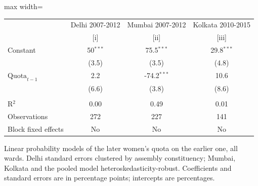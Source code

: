 
\begingroup
\centering
\scriptsize
\begin{adjustbox}{max width=\linewidth}
   \begin{threeparttable}[b]
      \begin{tabular}{lccc}
         \toprule
                               & Delhi 2007-2012 & Mumbai 2007-2012 & Kolkata 2010-2015 \\
                               & [i]             & [ii]             & [iii]\\
         \midrule
         Constant              & 50$^{***}$      & 75.5$^{***}$     & 29.8$^{***}$\\
                               & (3.5)           & (3.5)            & (4.8)\\
         $\text{Quota}_{t-1}$  & 2.2             & -74.2$^{***}$    & 10.6\\
                               & (6.6)           & (3.8)            & (8.6)\\
          \\
         R$^2$                 & 0.00            & 0.49             & 0.01\\
         Observations          & 272             & 227              & 141\\
         Block fixed effects   & No              & No               & No\\
         \bottomrule
      \end{tabular}

      \begin{tablenotes}
         \item Linear probability models of the later women's quota on the earlier one, all wards. Delhi standard errors clustered by assembly constituency; Mumbai, Kolkata and the pooled model heteroskedasticity-robust. Coefficients and standard errors are in percentage points; intercepts are percentages.
      \end{tablenotes}
   \end{threeparttable}
\end{adjustbox}
\par\endgroup


